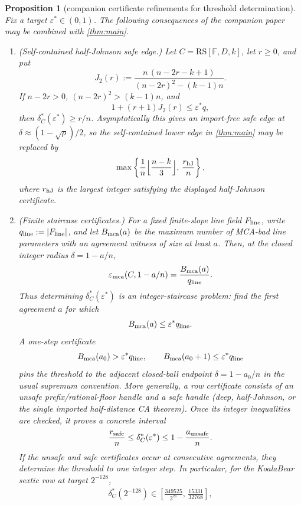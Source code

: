 \documentclass[11pt]{amsart}
\newtheorem{proposition}[proposition]{Proposition}
\theoremstyle{definition}
\theoremstyle{remark}
\newcommand{\F}{\mathbb{F}}
\newcommand{\RS}{\mathrm{RS}}
\newcommand{\emca}{\varepsilon_{\mathrm{mca}}}
\begin{document}
\begin{proposition}[companion certificate refinements for threshold determination]\label{prop:companion-certificate-package}
Fix a target $\varepsilon^*\in(0,1)$. The following consequences of the companion paper \cite{Cho26b} may be combined with \cref{thm:main}.
\begin{enumerate}
\item \textup{(Self-contained half-Johnson safe edge.)} Let $C=\RS[\F,D,k]$, let $r\ge0$, and put
\[
        J_2(r):=
        \frac{n\,(n-2r-k+1)}
             {(n-2r)^2-(k-1)n}.
\]
If $n-2r>0$, $(n-2r)^2>(k-1)n$, and
\[
        1+(r+1)J_2(r)\le \varepsilon^* q,
\]
then $\delta^*_C(\varepsilon^*)\ge r/n$.  Asymptotically this gives an import-free safe edge at $\delta\approx(1-\sqrt\rho)/2$, so the self-contained lower edge in \cref{thm:main} may be replaced by
\[
        \max\left\{\frac1n\Bigl\lfloor\frac{n-k}{3}\Bigr\rfloor,\,
        \frac{r_{\rm hJ}}n\right\},
\]
where $r_{\rm hJ}$ is the largest integer satisfying the displayed half-Johnson certificate.
\item \textup{(Finite staircase certificates.)} For a fixed finite-slope line field $F_{\rm line}$, write $q_{\rm line}:=|F_{\rm line}|$, and let $B_{\rm mca}(a)$ be the maximum number of MCA-bad line parameters with an agreement witness of size at least $a$.  Then, at the closed integer radius $\delta=1-a/n$,
\[
        \emca(C,1-a/n)=\frac{B_{\rm mca}(a)}{q_{\rm line}} .
\]
Thus determining $\delta^*_C(\varepsilon^*)$ is an integer-staircase problem: find the first agreement $a$ for which
\[
        B_{\rm mca}(a)\le \varepsilon^*q_{\rm line}.
\]
A one-step certificate
\[
        B_{\rm mca}(a_0)>\varepsilon^*q_{\rm line},
        \qquad
        B_{\rm mca}(a_0+1)\le \varepsilon^*q_{\rm line}
\]
pins the threshold to the adjacent closed-ball endpoint $\delta=1-a_0/n$ in the usual supremum convention. More generally, a row certificate consists of an unsafe prefix/rational-floor handle and a safe handle \textup{(deep, half-Johnson, or the single imported half-distance CA theorem)}.  Once its integer inequalities are checked, it proves a concrete interval
\[
        \frac{r_{\rm safe}}n
        \le
        \delta^*_C(\varepsilon^*)
        \le
        1-\frac{a_{\rm unsafe}}n .
\]
If the unsafe and safe certificates occur at consecutive agreements, they determine the threshold to one integer step.  In particular, for the KoalaBear sextic row at target $2^{-128}$,
\[
\begin{array}{ll}
        \delta^*_C(2^{-128})\in
        \left[\frac{349525}{2^{21}},\,\frac{15331}{32768}\right],

\end{array}\]
\end{enumerate}
\end{proposition}
\end{document}
